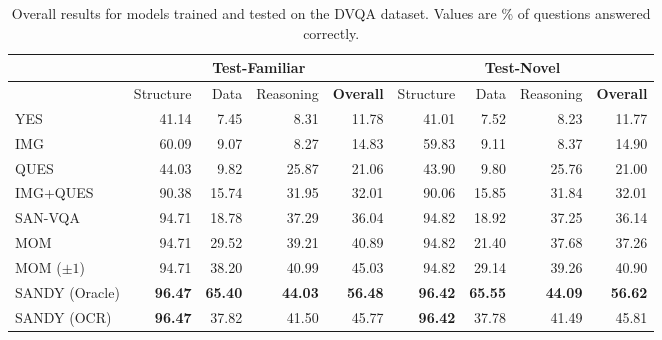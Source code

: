 \documentclass[10pt,twocolumn,letterpaper]{article}
\begin{document}
\begin{table}[t]
\centering
\footnotesize
\caption{Overall results for models trained and tested on the DVQA dataset. Values are \% of questions answered correctly.}
\vspace{-6pt}
\label{tbl:ques-type}
\begin{tabular}{@{}lrrrr|rrrr@{}}
\toprule
                     & \multicolumn{4}{c|}{\textbf{Test-Familiar}}       & \multicolumn{4}{c}{\textbf{Test-Novel}}       \\ \midrule
\multicolumn{1}{c}{} & Structure & Data & Reasoning & \textbf{Overall} & Structure & Data & Reasoning & \textbf{Overall} \\ \midrule
YES             & 41.14     & 7.45 	& 8.31      & 11.78          & 41.01     & 7.52 	& 8.23      & 11.77          \\
IMG             & 60.09     & 9.07  & 8.27      & 14.83          & 59.83     & 9.11 	& 8.37     	& 14.90            \\
QUES            & 44.03     & 9.82 	& 25.87     & 21.06          & 43.90    & 9.80	& 25.76     	& 21.00          \\
IMG+QUES        & 90.38     & 15.74 & 31.95     & 32.01          & 90.06     & 15.85   & 31.84     & 32.01            \\
SAN-VQA    		& 94.71    	& 18.78	& 37.29    	& 36.04         & 94.82     & 18.92 & 37.25     	& 36.14\\ \midrule
MOM    			& 94.71     & 29.52	& 39.21   	& 40.89         & 94.82    	& 21.40 & 37.68    		& 37.26          \\
MOM ($\pm 1$)   & 94.71    & 38.20	& 40.99    	& 45.03         & 94.82    	& 29.14 & 39.26     & 40.90          \\
SANDY (Oracle)    & \textbf{96.47}     & \textbf{65.40} & \textbf{44.03}  & \textbf{56.48}         	& \textbf{96.42}     & \textbf{65.55} & \textbf{44.09}     & \textbf{56.62}         \\
SANDY (OCR)    & \textbf{96.47}     & 37.82 & 41.50  & 45.77         & \textbf{96.42}    & 37.78 & 41.49     & 45.81         \\ \bottomrule
\end{tabular}
\end{table}
\end{document}
